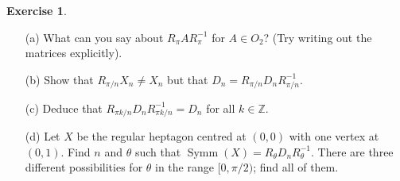\documentclass{amsart}
\DeclareMathOperator{\Symm}{Symm}
\renewcommand{\:}{\colon}
\newcommand{\Z}{\mathbb{Z}}
\newcommand{\tht}       {\theta}
\theoremstyle{definition}
\newtheorem{exercise}{Exercise}
\begin{document}
\begin{exercise}
 \begin{itemize}
  \item[(a)] What can you say about $R_\pi A R_\pi^{-1}$ for
   $A\in O_2$? (Try writing out the matrices explicitly).
  \item[(b)] Show that $R_{\pi/n}X_n\neq X_n$ but that
   $D_n=R_{\pi/n}D_nR_{\pi/n}^{-1}$.
  \item[(c)] Deduce that $R_{\pi k/n}D_nR_{\pi k/n}^{-1}=D_n$ for all
   $k\in\Z$. 
  \item[(d)]
   Let $X$ be the regular heptagon centred at $(0,0)$ with one vertex at
   $(0,1)$.  Find $n$ and $\tht$ such that
   $\Symm(X)=R_\tht D_n R_\tht^{-1}$.  There are three different
   possibilities for $\tht$ in the range $[0,\pi/2)$; find all of
   them.
   \begin{center}
   \end{center}
 \end{itemize}
\end{exercise}
\end{document}
